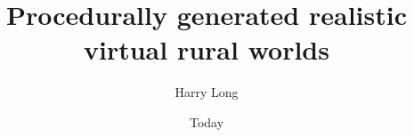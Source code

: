 \documentclass[a4paper,11pt]{report}
\begin{document}
\nocite{*}

\title{Procedurally generated realistic virtual rural worlds}
\author{Harry Long}
\date{Today}
\maketitle

\tableofcontents
\listoffigures
\listoftables



{}
\end{document}
